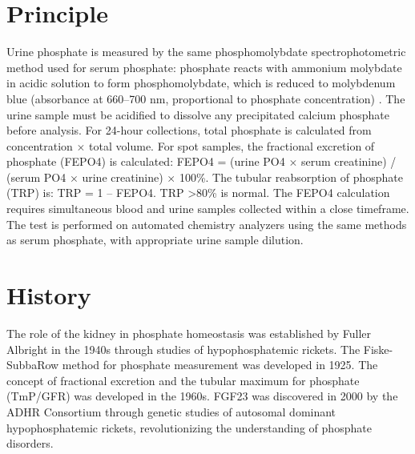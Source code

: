 \section*{Principle}
Urine phosphate is measured by the same phosphomolybdate spectrophotometric method used for serum phosphate: phosphate reacts with ammonium molybdate in acidic solution to form phosphomolybdate, which is reduced to molybdenum blue (absorbance at 660--700 nm, proportional to phosphate concentration) \cite{tietz2012textbook}. The urine sample must be acidified to dissolve any precipitated calcium phosphate before analysis. For 24-hour collections, total phosphate is calculated from concentration $\times$ total volume. For spot samples, the fractional excretion of phosphate (FEPO4) is calculated: FEPO4 = (urine PO4 $\times$ serum creatinine) / (serum PO4 $\times$ urine creatinine) $\times$ 100\%. The tubular reabsorption of phosphate (TRP) is: TRP = 1 -- FEPO4. TRP >80\% is normal. The FEPO4 calculation requires simultaneous blood and urine samples collected within a close timeframe. The test is performed on automated chemistry analyzers using the same methods as serum phosphate, with appropriate urine sample dilution.

\section*{History}
The role of the kidney in phosphate homeostasis was established by Fuller Albright in the 1940s through studies of hypophosphatemic rickets. The Fiske-SubbaRow method for phosphate measurement was developed in 1925. The concept of fractional excretion and the tubular maximum for phosphate (TmP/GFR) was developed in the 1960s. FGF23 was discovered in 2000 by the ADHR Consortium through genetic studies of autosomal dominant hypophosphatemic rickets, revolutionizing the understanding of phosphate disorders.

